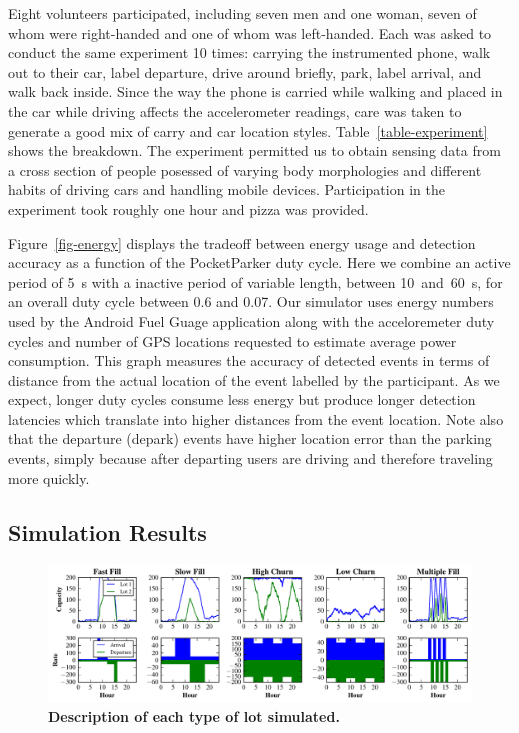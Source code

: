 Eight volunteers participated, including seven men and one woman, seven of
whom were right-handed and one of whom was left-handed. Each was asked to
conduct the same experiment 10 times: carrying the instrumented phone, walk
out to their car, label departure, drive around briefly, park, label arrival,
and walk back inside. Since the way the phone is carried while walking and
placed in the car while driving affects the accelerometer readings, care was
taken to generate a good mix of carry and car location styles.
Table~\ref{table-experiment} shows the breakdown. The experiment permitted us
to obtain sensing data from a cross section of people posessed of varying
body morphologies and different habits of driving cars and handling mobile
devices. Participation in the experiment took roughly one hour and pizza was
provided.

Figure~\ref{fig-energy} displays the tradeoff between energy usage and
detection accuracy as a function of the PocketParker duty cycle. Here we
combine an active period of 5~s with a inactive period of variable length,
between 10~and~60~s, for an overall duty cycle between 0.6 and 0.07. Our
simulator uses energy numbers used by the Android Fuel Guage application
along with the acceloremeter duty cycles and number of GPS locations
requested to estimate average power consumption. This graph measures the
accuracy of detected events in terms of distance from the actual location of
the event labelled by the participant. As we expect, longer duty cycles
consume less energy but produce longer detection latencies which translate
into higher distances from the event location. Note also that the departure
(depark) events have higher location error than the parking events, simply
because after departing users are driving and therefore traveling more
quickly.

\subsection{Simulation Results}
\label{subsec-simulator}

\begin{figure}
\centering
\includegraphics[width=\textwidth]{./simulator/figures/lots.pdf}

\caption{\textbf{Description of each type of lot simulated.} }

\label{fig-lotsdescription}
\end{figure}

